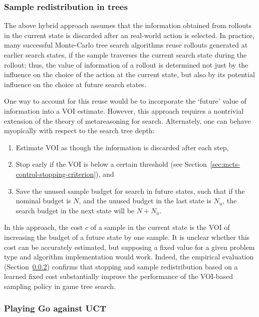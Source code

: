 \subsubsection{Sample redistribution in trees}
\label{sec:mcts-control-redistribution}

The above hybrid approach assumes
that the information obtained from rollouts in the
current state is discarded after an real-world action is selected. In practice,
many successful Monte-Carlo tree search algorithms reuse rollouts
generated at earlier search states, if the sample traverses the
current search state during the rollout; thus, the value of information of a rollout is
determined not just by the influence on the choice of the action at
the current state, but also by its potential influence on the choice at future
search states.

One way to account for this reuse would be to incorporate the
`future' value of information into a VOI estimate. However, this 
approach requires a nontrivial extension of the theory of metareasoning for search.
Alternately, one can behave myopically with respect to the search tree depth:
\begin{enumerate}
\item Estimate VOI as though the information is discarded after each step,
\item Stop early if the VOI is below a certain threshold
   (see Section~\ref{sec:mcts-control-stopping-criterion}), and
\item Save the unused sample budget for search in future states, such that
   if the nominal budget is $N$, and the unused budget in the last state
   is $N_u$, the search budget in the next state will be $N+N_u$.
\end{enumerate}
In this approach, the cost $c$ of a sample in the current state is the
VOI of increasing the budget of a future state by one sample.  It is
unclear whether this cost can be accurately estimated, but supposing
a fixed value for a given problem type and algorithm implementation
would work. Indeed, the empirical evaluation (Section~\ref{sec:mcts-emp-go})
confirms that stopping and sample redistribution based on a learned
fixed cost  substantially improve the performance of the VOI-based
sampling policy in game tree search.


\subsubsection{Playing Go against UCT}
\label{sec:mcts-emp-go}

